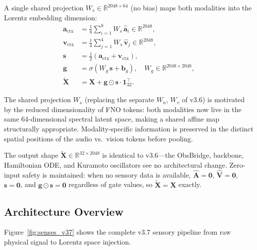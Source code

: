 A single shared projection $W_s \in \mathbb{R}^{2048 \times 64}$ (no bias) maps both
modalities into the Lorentz embedding dimension:
\begin{align}
\mathbf{a}_{\mathrm{ctx}} &= \frac{1}{8} \sum_{i=1}^{8} W_s\, \hat{\mathbf{a}}_i
    \in \mathbb{R}^{2048}, \label{eq:spectral_audio_proj} \\
\mathbf{v}_{\mathrm{ctx}} &= \frac{1}{4} \sum_{j=1}^{4} W_s\, \hat{\mathbf{v}}_j
    \in \mathbb{R}^{2048}, \label{eq:spectral_vision_proj} \\
\mathbf{s} &= \tfrac{1}{2}\!\left(\mathbf{a}_{\mathrm{ctx}} + \mathbf{v}_{\mathrm{ctx}}\right), \label{eq:spectral_ctx} \\
\mathbf{g} &= \sigma\!\left(W_g\, \mathbf{s} + \mathbf{b}_g\right),
    \quad W_g \in \mathbb{R}^{2048 \times 2048}, \label{eq:spectral_gate} \\
\tilde{\mathbf{X}} &= \mathbf{X} + \mathbf{g} \odot \mathbf{s} \cdot \mathbf{1}_{32}^\top. \label{eq:spectral_inject}
\end{align}

The shared projection $W_s$ (replacing the separate $W_a$, $W_v$ of v3.6) is motivated
by the reduced dimensionality of FNO tokens: both modalities now live in the same
64-dimensional spectral latent space, making a shared affine map structurally
appropriate.
Modality-specific information is preserved in the distinct spatial positions of the
audio vs.\ vision tokens before pooling.

The output shape $\tilde{\mathbf{X}} \in \mathbb{R}^{32 \times 2048}$ is identical to
v3.6---the ObsBridge, backbone, Hamiltonian ODE, and Kuramoto oscillators see no
architectural change.
Zero-input safety is maintained: when no sensory data is available,
$\hat{\mathbf{A}} = \mathbf{0}$, $\hat{\mathbf{V}} = \mathbf{0}$,
$\mathbf{s} = \mathbf{0}$, and $\mathbf{g} \odot \mathbf{s} = \mathbf{0}$
regardless of gate values, so $\tilde{\mathbf{X}} = \mathbf{X}$ exactly.

\subsection{Architecture Overview}
\label{sec:v37_arch}

Figure~\ref{fig:senses_v37} shows the complete v3.7 sensory pipeline from raw physical
signal to Lorentz space injection.

